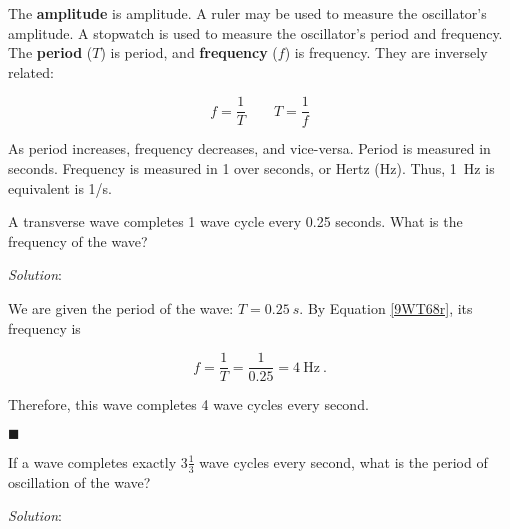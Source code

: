 \documentclass[dvipsnames]{article}
\begin{document}
The \textbf{\gls{amplitude}} is \glsdesc{amplitude}. A ruler may be used to measure the oscillator's amplitude. A stopwatch is used to measure the oscillator's period and frequency. The \textbf{\gls{period}} ($T$) is \glsdesc{period}, and \textbf{\gls{frequency}} ($f$) is \glsdesc{frequency}. They are inversely related:

\begin{equation} \label{9WT68r}
    f = \frac{1}{T} \hspace{2em} 
    T = \frac{1}{f}
\end{equation}

As period increases, frequency decreases, and vice-versa. Period is measured in seconds. Frequency is measured in 1 over seconds, or Hertz (Hz). Thus, \SI{1}{Hz} is equivalent is 1/s.


\begin{example}
    A transverse wave completes 1 wave cycle every 0.25 seconds. What is the frequency of the wave?
\end{example}

\textit{Solution}: 

We are given the period of the wave: $T = \SI{0.25}{s}$. By Equation \ref{9WT68r}, its frequency is

\begin{equation*}
    f = \frac{1}{T} = \frac{1}{0.25} = \SI{4}{\Hz}\ .
\end{equation*}

Therefore, this wave completes 4 wave cycles every second.

\hfill $\blacksquare$

\begin{example}
    If a wave completes exactly $3 \frac{1}{3}$ wave cycles every second, what is the period of oscillation of the wave? 
\end{example}

\textit{Solution}: 
\end{document}
